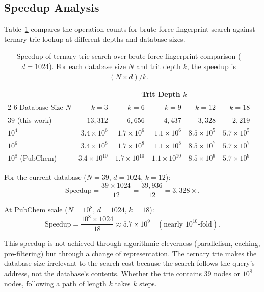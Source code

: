 \documentclass[11pt,twocolumn,a4paper]{article}
\theoremstyle{definition}
\theoremstyle{remark}
\begin{document}
\subsection{Speedup Analysis}

Table~\ref{tab:speedup} compares the operation counts for brute-force fingerprint search against ternary trie lookup at different depths and database sizes.

\begin{table}[H]
\centering
\caption{Speedup of ternary trie search over brute-force fingerprint comparison ($d = 1024$). For each database size $N$ and trit depth $k$, the speedup is $(N \times d) / k$.}
\label{tab:speedup}
\begin{tabular}{lrrrrr}
\toprule
& \multicolumn{5}{c}{Trit Depth $k$} \\
\cmidrule(lr){2-6}
Database Size $N$ & $k=3$ & $k=6$ & $k=9$ & $k=12$ & $k=18$ \\
\midrule
$39$ (this work)        & $13{,}312$ & $6{,}656$ & $4{,}437$ & $3{,}328$ & $2{,}219$ \\
$10^4$                  & $3.4 \times 10^6$ & $1.7 \times 10^6$ & $1.1 \times 10^6$ & $8.5 \times 10^5$ & $5.7 \times 10^5$ \\
$10^6$                  & $3.4 \times 10^8$ & $1.7 \times 10^8$ & $1.1 \times 10^8$ & $8.5 \times 10^7$ & $5.7 \times 10^7$ \\
$10^8$ (PubChem)        & $3.4 \times 10^{10}$ & $1.7 \times 10^{10}$ & $1.1 \times 10^{10}$ & $8.5 \times 10^9$ & $5.7 \times 10^9$ \\
\bottomrule
\end{tabular}
\end{table}

For the current database ($N = 39$, $d = 1024$, $k = 12$):
\begin{equation}
\text{Speedup} = \frac{39 \times 1024}{12} = \frac{39{,}936}{12} = 3{,}328\times.
\end{equation}

At PubChem scale ($N = 10^8$, $d = 1024$, $k = 18$):
\begin{equation}
\text{Speedup} = \frac{10^8 \times 1024}{18} \approx 5.7 \times 10^9 \quad (\text{nearly } 10^{10}\text{-fold}).
\end{equation}

This speedup is not achieved through algorithmic cleverness (parallelism, caching, pre-filtering) but through a change of representation. The ternary trie makes the database size irrelevant to the search cost because the search follows the query's address, not the database's contents. Whether the trie contains 39 nodes or $10^8$ nodes, following a path of length $k$ takes $k$ steps.
\end{document}
